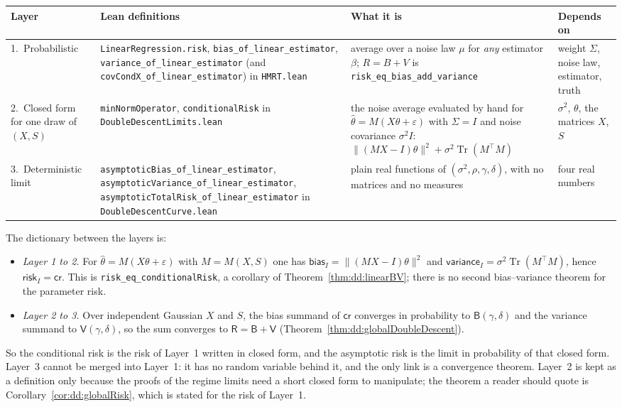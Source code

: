 \begin{remark}
\begin{itemize}
\end{itemize}
\begin{center}
\begin{tabular}{p{2.2cm}p{4.6cm}p{4.2cm}p{2.6cm}}
\hline
Layer & Lean definitions & What it is & Depends on\\
\hline
1.\ Probabilistic & \texttt{LinearRegression.risk}, \texttt{bias\_of\_linear\_estimator}, \texttt{variance\_of\_linear\_estimator} (and \texttt{covCondX\_of\_linear\_estimator}) in \texttt{HMRT.lean} & average over a noise law $\mu$ for \emph{any} estimator $\hat\beta$; $R=B+V$ is \texttt{risk\_eq\_bias\_add\_variance} & weight $\Sigma$, noise law, estimator, truth\\
2.\ Closed form for one draw of $(X,S)$ & \texttt{minNormOperator}, \texttt{conditionalRisk} in \texttt{DoubleDescentLimits.lean} & the noise average evaluated by hand for $\hat\theta=M(X\theta+\varepsilon)$ with $\Sigma=I$ and noise covariance $\sigma^2I$: $\|(MX-I)\theta\|^2+\sigma^2\operatorname{Tr}(M^\top M)$ & $\sigma^2$, $\theta$, the matrices $X$, $S$\\
3.\ Deterministic limit & \texttt{asymptoticBias\_of\_linear\_estimator}, \texttt{asymptoticVariance\_of\_linear\_estimator}, \texttt{asymptoticTotalRisk\_of\_linear\_estimator} in \texttt{DoubleDescentCurve.lean} & plain real functions of $(\sigma^2,\rho,\gamma,\delta)$, with no matrices and no measures & four real numbers\\
\hline
\end{tabular}
\end{center}
The dictionary between the layers is:
\begin{itemize}
  \item \emph{Layer 1 to 2.} For $\hat\theta=M(X\theta+\varepsilon)$ with $M=M(X,S)$ one has $\mathsf{bias}_I=\|(MX-I)\theta\|^2$ and $\mathsf{variance}_I=\sigma^2\operatorname{Tr}(M^\top M)$, hence $\mathsf{risk}_I=\mathsf{cr}$. This is \texttt{risk\_eq\_conditionalRisk}, a corollary of Theorem~\ref{thm:dd:linearBV}; there is no second bias--variance theorem for the parameter risk.
  \item \emph{Layer 2 to 3.} Over independent Gaussian $X$ and $S$, the bias summand of $\mathsf{cr}$ converges in probability to $\mathsf B(\gamma,\delta)$ and the variance summand to $\mathsf V(\gamma,\delta)$, so the sum converges to $\mathsf R=\mathsf B+\mathsf V$ (Theorem~\ref{thm:dd:globalDoubleDescent}).
\end{itemize}
So the conditional risk is the risk of Layer~1 written in closed form, and the asymptotic risk is the limit in probability of that closed form. Layer~3 cannot be merged into Layer~1: it has no random variable behind it, and the only link is a convergence theorem. Layer~2 is kept as a definition only because the proofs of the regime limits need a short closed form to manipulate; the theorem a reader should quote is Corollary~\ref{cor:dd:globalRisk}, which is stated for the risk of Layer~1.
\end{remark}

